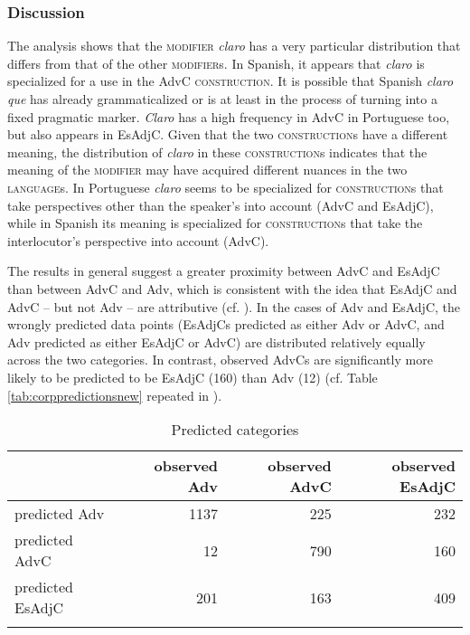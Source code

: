 \subsubsection{Discussion}
The analysis shows that the \textsc{modifier} \textit{claro} has a very particular distribution that differs from  that of the other \textsc{modifier}s. In Spanish, it appears that \textit{claro} is specialized for a use in the AdvC \textsc{construction}. It is possible that Spanish \textit{claro que} has already grammaticalized or is at least in the process of turning into a fixed pragmatic marker.  \textit{Claro} has a high frequency in AdvC in Portuguese too,  but also appears in EsAdjC.  Given that the two \textsc{construction}s have a different meaning, the distribution of \textit{claro} in these \textsc{construction}s indicates that  the meaning of the \textsc{modifier}   may  have acquired different nuances in the two \textsc{language}s. In Portuguese  \textit{claro} seems to be specialized for \textsc{construction}s that take perspectives other than the speaker's into account (AdvC and EsAdjC), while in Spanish its meaning  is specialized for \textsc{construction}s that take the interlocutor's perspective into account (AdvC).


The results in general suggest a greater proximity between AdvC and EsAdjC than between AdvC and Adv, which is consistent with the idea that EsAdjC and AdvC – but not Adv – are attributive (cf. ). In the cases of Adv and EsAdjC, the wrongly predicted data points (EsAdjCs predicted as either Adv or AdvC, and Adv predicted as either EsAdjC or AdvC) are distributed relatively equally across the two  categories. In contrast, observed AdvCs are significantly more likely to be predicted to be EsAdjC (160) than Adv (12) (cf. Table \ref{tab:corppredictionsnew} repeated in ). 

\begin{table}
	\begin{tabular}{lrrr}
		\lsptoprule
		& observed Adv & observed AdvC & observed EsAdjC \\\midrule
		predicted	Adv & 1137 & 225 & 232 \\ 
		predicted	AdvC &  12 & 790 & 160 \\ 
		predicted	EsAdjC & 201 & 163 & 409 \\ 
\lspbottomrule
	\end{tabular}
	\caption{Predicted categories \label{tab:corppredictions}}
\end{table}
 


